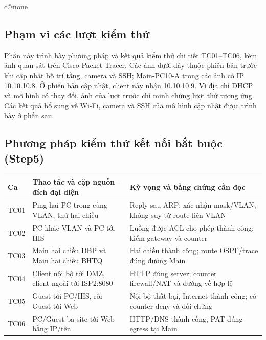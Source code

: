 \ifcsname c@none\endcsname\else{}\fi
\subsection{Phạm vi các lượt kiểm thử}
Phần này trình bày phương pháp và kết quả kiểm thử chi tiết TC01--TC06,
kèm ảnh quan sát trên Cisco Packet Tracer. Các ảnh dưới đây
thuộc phiên bản trước khi cập nhật bố trí tầng, camera và SSH; Main-PC10-A
trong các ảnh có IP 10.10.10.8. Ở phiên bản cập nhật, client này nhận
10.10.10.9. Vì địa chỉ DHCP và mô hình có thay đổi, ảnh của lượt trước chỉ
minh chứng lượt thử tương ứng. Các kết quả bổ sung về Wi-Fi, camera và
SSH của mô hình cập nhật được trình bày ở phần sau.

\FloatBarrier
\subsection{Phương pháp kiểm thử kết nối bắt buộc
(Step5)}\label{phux1b0ux1a1ng-phuxe1p-kiux1ec3m-thux1eed-kux1ebft-nux1ed1i-bux1eaft-buux1ed9c-step5}

{\def\LTcaptype{none} %
\begin{longtable}[]{@{}
  >{\raggedright\arraybackslash}p{}
  >{\raggedright\arraybackslash}p{}
  >{\raggedright\arraybackslash}p{}@{}}
\toprule\noalign{}
\begin{minipage}[b]{\linewidth}\raggedright
Ca
\end{minipage} & \begin{minipage}[b]{\linewidth}\raggedright
Thao tác và cặp nguồn--đích đại diện
\end{minipage} & \begin{minipage}[b]{\linewidth}\raggedright
Kỳ vọng và bằng chứng cần đọc
\end{minipage} \\
\midrule\noalign{}
\endhead
\bottomrule\noalign{}
\endlastfoot
TC01 & Ping hai PC trong cùng VLAN, thử hai chiều & Reply sau ARP; xác
nhận mask/VLAN, không suy từ route liên VLAN \\
TC02 & PC khác VLAN và PC tới HIS & Luồng được ACL cho phép thành công;
kiểm gateway và counter \\
TC03 & Main hai chiều DBP và Main hai chiều BHTQ & Hai chiều thành công;
route OSPF/trace đúng đường Main \\
TC04 & Client nội bộ tới DMZ, client ngoài tới ISP2:8080 & HTTP đúng
server; counter firewall/NAT và đường về hợp lệ \\
TC05 & Guest tới PC/HIS, rồi Guest tới Web & Nội bộ thất bại, Internet
thành công; có counter deny và đối chứng \\
TC06 & PC/Guest ba site tới Web bằng IP/tên & HTTP/DNS thành công, PAT
đúng egress tại Main \\
\end{longtable}
}


